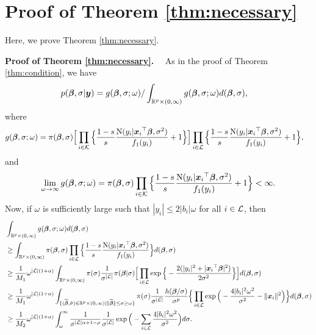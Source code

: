 \documentclass[12pt]{article}
\def\si{{\sigma}}
\def\al{{\alpha}}
\def\si{{\sigma}}
\def\om{{\omega}}
\def\non{{\nonumber}}
\def\Lc{{\cal L}}
\def\Kc{{\cal K}}
\def\al{{\alpha}}
\def\si{{\sigma}}
\def\om{{\omega}}
\def\bbe{{\text{\boldmath $\beta$}}}
\def\sit{{\tilde \si}}
\def\bbet{{\widetilde \bbe}}
\def\x{{\text{\boldmath $x$}}}
\def\y{{\text{\boldmath $y$}}}
\def\Lc{{\cal L}}
\def\Kc{{\cal K}}
\def\non{{\nonumber}}
\begin{document}
\section{Proof of Theorem \ref{thm:necessary}}

Here, we prove Theorem \ref{thm:necessary}. 




\bigskip

\noindent
{\bf Proof of Theorem \ref{thm:necessary}.} \ \ As in the proof of Theorem \ref{thm:condition}, we have 
\begin{align}
p( \bbe , \si | \y ) &= g( \bbe , \si ; \om ) / \int_{\mathbb{R} ^p \times (0, \infty )} g( \bbe , \si ; \om ) d( \bbe , \si ) \text{,} \non 
\end{align}
where 
\begin{align}
g( \bbe , \si ; \om ) %
&= \pi ( \bbe , \si ) \Big[ \prod_{i \in \Kc } \Big\{ {1 - s \over s} {{\rm{N}} ( y_i | {\x _i}^{\top } \bbe , \si ^2 ) \over f_1 ( y_i )} + 1 \Big\} \Big] \prod_{i \in \Lc } \Big\{ {1 - s \over s} {{\rm{N}} ( y_i | {\x _i}^{\top } \bbe , \si ^2 ) \over f_1 ( y_i )} + 1 \Big\} \text{,} \non 
\end{align}
and 
\begin{align}
\lim_{\om \to \infty } g( \bbe , \si ; \om ) = \pi ( \bbe , \si ) \prod_{i \in \Kc } \Big\{ {1 - s \over s} {{\rm{N}} ( y_i | {\x _i}^{\top } \bbe , \si ^2 ) \over f_1 ( y_i )} + 1 \Big\} < \infty \text{.} \non 
\end{align}
Now, if $\om $ is sufficiently large such that $| y_i | \le 2 | b_i | \om $ for all $i \in \Lc $, then 
\begin{align}
&\int_{\mathbb{R} ^p \times (0, \infty )} g( \bbe , \si ; \om ) d( \bbe , \si ) \non \\
&\ge \int_{\mathbb{R} ^p \times (0, \infty )} \pi ( \bbe , \si ) \prod_{i \in \Lc } \Big\{ {1 - s \over s} {{\rm{N}} ( y_i | {\x _i}^{\top } \bbe , \si ^2 ) \over f_1 ( y_i )} \Big\} d( \bbe , \si ) \non \\
&\ge {1 \over M_1} \om ^{| \Lc | (1 + \al )} \int_{\mathbb{R} ^p \times (0, \infty )} \pi ( \si ) {1 \over \si ^{| \Lc |}} \pi ( \bbe | \si ) \Big[ \prod_{i \in \Lc } \exp \Big\{ - {2 (| y_i |^2 + | {\x _i}^{\top } \bbe |^2 ) \over 2 \si ^2} \Big\} \Big] d( \bbe , \si ) \non \\
&\ge {1 \over M_1} \om ^{| \Lc | (1 + \al )} \int_{\{ ( \bbet , \sit ) \in \mathbb{R} ^p \times (0, \infty ) | \| \bbet \| \le \si \ge \om \} } \pi ( \si ) {1 \over \si ^{| \Lc |}} {h( \bbe / \si ) \over \si ^p} \Big\{ \prod_{i \in \Lc } \exp \Big( - {4 | b_i |^2 \om ^2 \over \si ^2} - \| \x _i \| ^2 \Big) \Big\} d( \bbe , \si ) \non \\
&\ge {1 \over M_2} \om ^{| \Lc | (1 + \al )} \int_{\om }^{\infty } {1 \over \si ^{| \Lc | \al + 1 - \rho }} {1 \over \si ^{| \Lc |}} \exp \Big( - \sum_{i \in \Lc } {4 | b_i |^2 \om ^2 \over \si ^2} \Big) d\si \text{.} \non 
\end{align}
\end{document}
